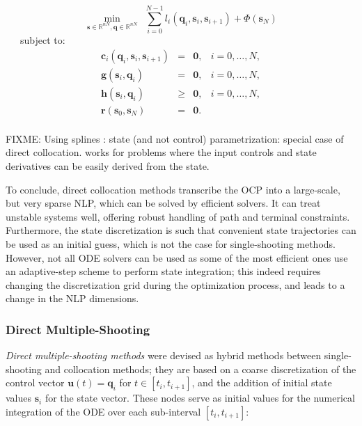 \begin{equation}
  \min_{\mathbf{s}\in\mathbb R^{nN},\mathbf{q}\in\mathbb R^{nN}} \ \ \sum_{i=0}^{N-1}l_i(\mathbf{q}_i,\mathbf{s}_i,\mathbf{s}_{i+1}) + \Phi(\mathbf{s}_N)
\end{equation}
\ \ \ subject to:
\begin{equation}
  \begin{array}{rclr}
    \mathbf{c}_i(\mathbf{q}_i,\mathbf{s}_i,\mathbf{s}_{i+1}) & = & \mathbf{0}, & i=0,\ldots,N,%
    \\
    \mathbf{g}(\mathbf{s}_i,\mathbf{q}_i) & = & \mathbf{0}, & i=0,\ldots,N,%
    \\%
    \mathbf{h}(\mathbf{s}_i,\mathbf{q}_i) & \ge & \mathbf{0}, & i=0,\ldots,N,%
    \\%
    \mathbf{r} (\mathbf{s}_0, \mathbf{s}_N) & = & \mathbf{0}.%
    \\%
  \end{array}
\end{equation} 

FIXME: Using splines : state (and not control) parametrization:
special case of direct collocation. works for problems where the input
controls and state derivatives can be easily derived from the
state. \cite{sirinesa1981}

To conclude, direct collocation methods transcribe the OCP into a
large-scale, but very sparse NLP, which can be solved by efficient
solvers. It can treat unstable systems well, offering robust handling
of path and terminal constraints. Furthermore, the state
discretization is such that convenient state trajectories can be used
as an initial guess, which is not the case for single-shooting
methods. However, not all ODE solvers can be used as some of the most
efficient ones use an adaptive-step scheme to perform state
integration; this indeed requires changing the discretization grid
during the optimization process, and leads to a change in the NLP
dimensions.

\subsubsection{Direct Multiple-Shooting}
\label{subsubsec:chap3-direct-multiple-shooting}

\emph{Direct multiple-shooting methods} \cite{Bock1984} were devised
as hybrid methods between single-shooting and collocation methods;
they are based on a coarse discretization of the control vector
$\mathbf{u}(t)=\mathbf{q}_i$ for $t\in\left[t_i,t_{i+1}\right]$, and
the addition of initial state values $\mathbf{s}_i$ for the state
vector. These nodes serve as initial values for the numerical
integration of the ODE over each sub-interval $[t_i,t_{i+1}]$:

